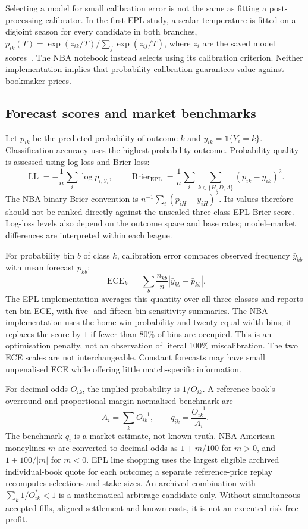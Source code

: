 Selecting a model for small calibration error is not the same as fitting a
post-processing calibrator. In the first EPL study, a scalar temperature is
fitted on a disjoint season for every candidate in both branches,
$p_{ik}(T)=\exp(z_{ik}/T)/\sum_j\exp(z_{ij}/T)$, where $z_i$ are the saved
model scores~\cite{guo2017calibration}. The NBA notebook instead selects using
its calibration criterion. Neither implementation implies that probability
calibration guarantees value against bookmaker prices.

\subsection{Forecast scores and market benchmarks}
Let $p_{ik}$ be the predicted probability of outcome $k$ and
$y_{ik}=\mathbb{1}\{Y_i=k\}$. Classification accuracy uses the highest-probability
outcome. Probability quality is assessed using log loss and Brier loss:
\begin{equation}
 \operatorname{LL}=-\frac{1}{n}\sum_i\log p_{i,Y_i},\qquad
 \operatorname{Brier}_{\mathrm{EPL}}=\frac{1}{n}\sum_i\sum_{k\in\{H,D,A\}}
 (p_{ik}-y_{ik})^2.
\end{equation}
The NBA binary Brier convention is $n^{-1}\sum_i(p_{iH}-y_{iH})^2$.
Its values therefore should not be ranked directly against the unscaled
three-class EPL Brier score. Log-loss levels also depend on the outcome space
and base rates; model--market differences are interpreted within each league.

For probability bin $b$ of class $k$, calibration error compares observed
frequency $\bar y_{kb}$ with mean forecast $\bar p_{kb}$:
\begin{equation}
 \operatorname{ECE}_k=\sum_b\frac{n_{kb}}{n}
       |\bar y_{kb}-\bar p_{kb}|.
\end{equation}
The EPL implementation averages this quantity over all three classes and
reports ten-bin ECE, with five- and fifteen-bin sensitivity summaries. The NBA
implementation uses the home-win probability and twenty equal-width bins;
it replaces the score by $1$ if fewer than 80\% of bins are occupied. This is
an optimisation penalty, not an observation of literal 100\% miscalibration.
The two ECE scales are not interchangeable. Constant forecasts may have small
unpenalised ECE while offering little match-specific information.

For decimal odds $O_{ik}$, the implied probability is $1/O_{ik}$. A reference
book's overround and proportional margin-normalised benchmark are
\begin{equation}
 A_i=\sum_k O_{ik}^{-1},\qquad
 q_{ik}=\frac{O_{ik}^{-1}}{A_i}.
\end{equation}
The benchmark $q_i$ is a market estimate, not known truth. NBA American
moneylines $m$ are converted to decimal odds as $1+m/100$ for $m>0$, and
$1+100/|m|$ for $m<0$. EPL line shopping uses the largest eligible archived
individual-book quote for each outcome; a separate reference-price replay
recomputes selections and stake sizes. An archived combination with
$\sum_k1/O^*_{ik}<1$ is a mathematical arbitrage candidate only. Without
simultaneous accepted fills, aligned settlement and known costs, it is not an
executed risk-free profit.

